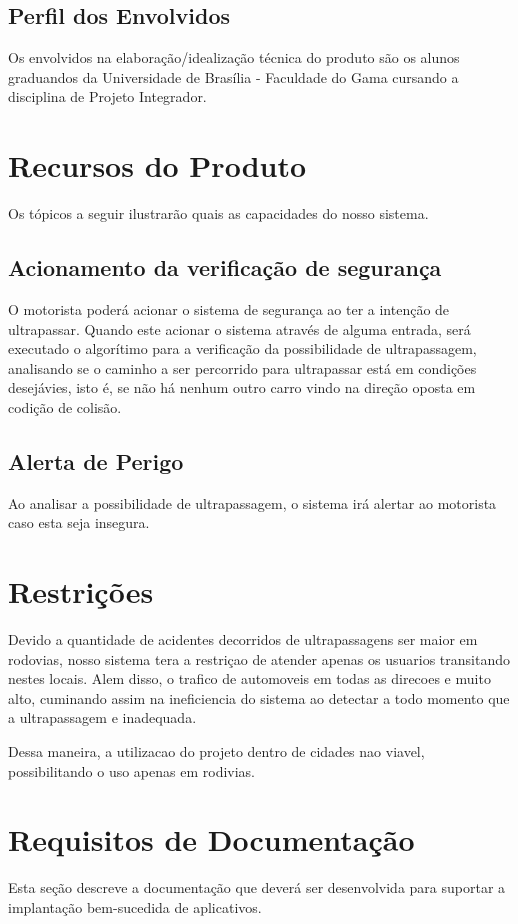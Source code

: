 \subsection{Perfil dos Envolvidos}
Os envolvidos na elaboração/idealização técnica do produto são os alunos graduandos da Universidade de Brasília - Faculdade do Gama cursando a disciplina de Projeto Integrador.

\section{Recursos do Produto}
Os tópicos a seguir ilustrarão quais as capacidades do nosso sistema.
\subsection{Acionamento da verificação de segurança}
O motorista poderá acionar o sistema de segurança ao ter a intenção de ultrapassar.
Quando este acionar o sistema através de alguma entrada, será executado o algorítimo para a verificação da possibilidade de
ultrapassagem, analisando se o caminho a ser percorrido para ultrapassar está em condições desejávies, isto é,
se não há nenhum outro carro vindo na direção oposta em codição de colisão.

\subsection{Alerta de Perigo}
Ao analisar a possibilidade de ultrapassagem, o sistema irá alertar ao motorista caso esta seja insegura.

\section{Restrições}
Devido a quantidade de acidentes decorridos de ultrapassagens ser maior em rodovias, nosso sistema tera a restriçao de atender apenas os usuarios transitando nestes locais. Alem disso, o trafico de automoveis em todas as direcoes e muito alto, cuminando assim na ineficiencia do sistema ao detectar a todo momento que a ultrapassagem e inadequada.

Dessa maneira, a utilizacao do projeto dentro de cidades nao viavel, possibilitando o uso apenas em rodivias.

\section{Requisitos de Documentação}
Esta seção descreve a documentação que deverá ser desenvolvida para suportar a implantação bem-sucedida de aplicativos.

